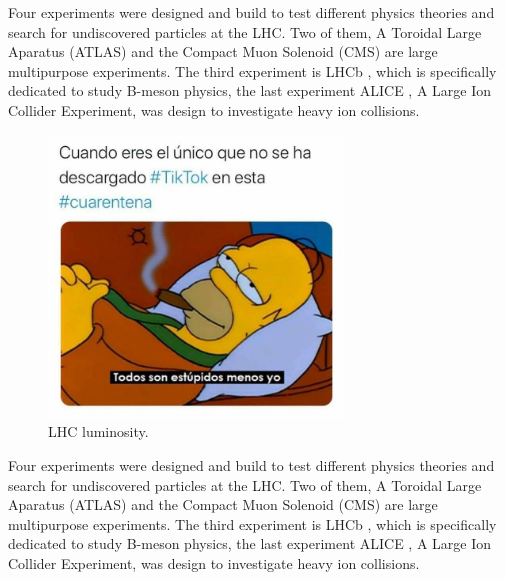 Four experiments were designed and build to test different physics theories and search for undiscovered particles at the LHC. Two of them, A Toroidal Large Aparatus (ATLAS)\cite{atlas} and the Compact Muon Solenoid (CMS)\cite{cms_doc} are large multipurpose experiments. The third experiment is LHCb \cite{lhcb}, which is specifically dedicated to study B-meson physics, the last experiment ALICE \cite{alice}, A Large Ion Collider Experiment, was design to investigate heavy ion collisions.


\begin{figure}[!h]
  \centering
  \includegraphics[width=0.7\textwidth]{../images/ch2/1}
  \caption[LHC luminosity]{LHC luminosity.}\label{fig:cms_layout}
\end{figure}
Four experiments were designed and build to test different physics theories and search for undiscovered particles at the LHC. Two of them, A Toroidal Large Aparatus (ATLAS)\cite{atlas} and the Compact Muon Solenoid (CMS)\cite{cms_doc} are large multipurpose experiments. The third experiment is LHCb \cite{lhcb}, which is specifically dedicated to study B-meson physics, the last experiment ALICE \cite{alice}, A Large Ion Collider Experiment, was design to investigate heavy ion collisions.
